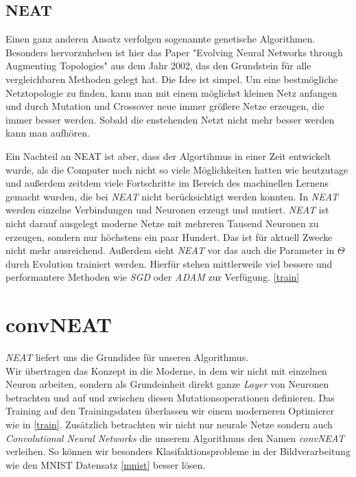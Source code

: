 \documentclass[]{scrartcl}
\begin{document}
		\subsection{NEAT}

			Einen ganz anderen Ansatz verfolgen sogenannte genetische Algorithmen. Besonders hervorzuheben ist hier das Paper
			"Evolving Neural Networks through Augmenting Topologies" \cite{neat} aus dem Jahr 2002, das den Grundstein für alle vergleichbaren Methoden gelegt hat.
			Die Idee ist simpel. Um eine bestmögliche Netztopologie zu finden, kann man mit einem möglichst kleinen Netz anfangen und durch Mutation und Crossover
			neue immer größere Netze erzeugen, die immer besser werden. Sobald die enstehenden Netzt nicht mehr besser werden kann man aufhören.

			Ein Nachteil an NEAT ist aber, dass der Algortihmus in einer Zeit entwickelt wurde, als die Computer noch nicht so viele Möglichkeiten hatten wie heutzutage
			und außerdem zeitdem viele Fortschritte im Bereich des machinellen Lernens gemacht wurden, die bei \textit{NEAT} nicht berücksichtigt werden konnten.
			In \textit{NEAT} werden einzelne Verbindungen und Neuronen erzeugt und mutiert. \textit{NEAT} ist nicht darauf ausgelegt moderne Netze
			mit mehreren Tausend Neuronen zu erzeugen, sondern nur höchstens ein paar Hundert. Das ist für aktuell Zwecke nicht mehr ausreichend.
			Außerdem sieht \textit{NEAT} vor das auch die Parameter in $\Theta$ durch Evolution trainiert werden. Hierfür stehen
			mittlerweile viel bessere und performantere Methoden wie \textit{SGD} oder \textit{ADAM} zur Verfügung. \ref{train}

	\clearpage

	\section{convNEAT}

		\textit{NEAT} liefert uns die Grundidee für unseren Algorithmus. \\
		Wir übertragen das Konzept in die Moderne, in dem wir nicht mit einzelnen Neuron arbeiten,
		sondern als Grundeinheit direkt ganze \textit{Layer} von Neuronen betrachten und auf und zwischen diesen Mutationsoperationen definieren.
		Das Training auf den Trainingsdaten überlassen wir einem moderneren Optimierer wie in \ref{train}.
		Zusätzlich betrachten wir nicht nur neurale Netze sondern auch \textit{Convolutional Neural Networks} die unserem Algorithmus den Namen \textit{convNEAT}
		verleihen. So können wir besonders Klasifaktionsprobleme in der Bildverarbeitung wie den MNIST Datensatz \ref{mnist} besser lösen.
\end{document}
